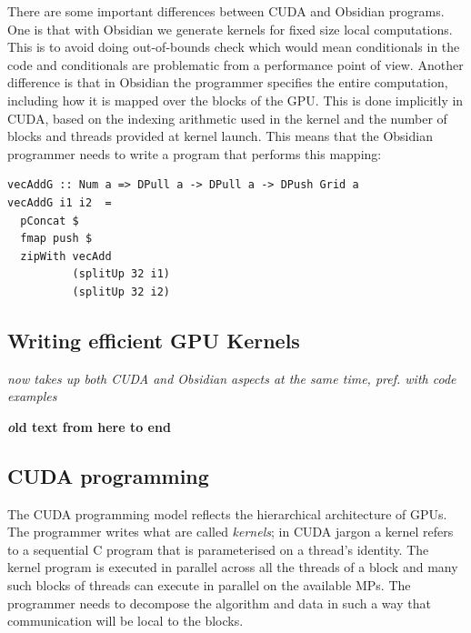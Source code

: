 \documentclass[a4paper]{book}
\begin{document}
There are some important differences between CUDA and Obsidian programs. One is that with Obsidian 
we generate kernels for fixed size local computations. This is to avoid doing out-of-bounds check 
which would mean conditionals in the code and conditionals are problematic from a performance 
point of view. Another difference is that in Obsidian the programmer specifies the entire 
computation, including how it is mapped over the blocks of the GPU. This is done implicitly 
in CUDA, based on the indexing arithmetic used in the kernel and the number of blocks and 
threads provided at kernel launch. This means that the Obsidian programmer needs to 
write a program that performs this mapping: 

\begin{small} 
\begin{Verbatim}[samepage=true]
vecAddG :: Num a => DPull a -> DPull a -> DPush Grid a
vecAddG i1 i2  =
  pConcat $
  fmap push $
  zipWith vecAdd
          (splitUp 32 i1)
          (splitUp 32 i2)  
\end{Verbatim}
\end{small}


\subsection{Writing efficient GPU Kernels} 
 \emph{now takes up both CUDA and Obsidian aspects at the same time, pref. with code examples} 
  


{\bf {\emph old text from here to end}}


%
%

\subsection{CUDA programming} 

The CUDA programming model reflects the hierarchical architecture of GPUs. The programmer 
writes what are called {\em kernels}; in CUDA jargon a kernel refers to a sequential C program 
that is parameterised on a thread's identity. The kernel program is executed in parallel across 
all the threads of a block and many such blocks of threads can execute in parallel on the 
available MPs. The programmer needs to decompose the algorithm and data in such a way that 
communication will be local to the blocks. 
\end{document}
